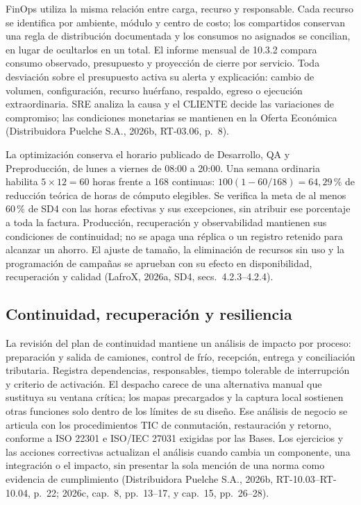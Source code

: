 FinOps utiliza la misma relación entre carga, recurso y responsable. Cada recurso se identifica por ambiente, módulo y centro de costo; los compartidos conservan una regla de distribución documentada y los consumos no asignados se concilian, en lugar de ocultarlos en un total. El informe mensual de 10.3.2 compara consumo observado, presupuesto y proyección de cierre por servicio. Toda desviación sobre el presupuesto activa su alerta y explicación: cambio de volumen, configuración, recurso huérfano, respaldo, egreso o ejecución extraordinaria. SRE analiza la causa y el CLIENTE decide las variaciones de compromiso; las condiciones monetarias se mantienen en la Oferta Económica (Distribuidora Puelche S.A., 2026b, RT-03.06, p.~8).

La optimización conserva el horario publicado de Desarrollo, QA y Preproducción, de lunes a viernes de 08:00 a 20:00. Una semana ordinaria habilita $5\times12=60$ horas frente a 168 continuas: $100(1-60/168)=64,29$\,\% de reducción teórica de horas de cómputo elegibles. Se verifica la meta de al menos 60\,\% de SD4 con las horas efectivas y sus excepciones, sin atribuir ese porcentaje a toda la factura. Producción, recuperación y observabilidad mantienen sus condiciones de continuidad; no se apaga una réplica o un registro retenido para alcanzar un ahorro. El ajuste de tamaño, la eliminación de recursos sin uso y la programación de campañas se aprueban con su efecto en disponibilidad, recuperación y calidad (LafroX, 2026a, SD4, secs.~4.2.3--4.2.4).

\subsection{Continuidad, recuperación y resiliencia}
\label{subsec:sd11-continuidad}

La revisión del plan de continuidad mantiene un análisis de impacto por proceso: preparación y salida de camiones, control de frío, recepción, entrega y conciliación tributaria. Registra dependencias, responsables, tiempo tolerable de interrupción y criterio de activación. El despacho carece de una alternativa manual que sustituya su ventana crítica; los mapas precargados y la captura local sostienen otras funciones solo dentro de los límites de su diseño. Ese análisis de negocio se articula con los procedimientos TIC de conmutación, restauración y retorno, conforme a ISO 22301 e ISO/IEC 27031 exigidas por las Bases. Los ejercicios y las acciones correctivas actualizan el análisis cuando cambia un componente, una integración o el impacto, sin presentar la sola mención de una norma como evidencia de cumplimiento (Distribuidora Puelche S.A., 2026b, RT-10.03--RT-10.04, p.~22; 2026c, cap.~8, pp.~13--17, y cap.~15, pp.~26--28).

